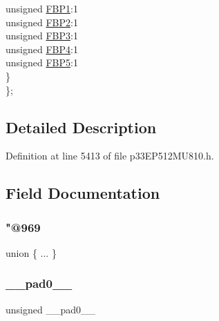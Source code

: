 \begin{DoxyCompactItemize}
\begin{tabbing}
\>\>unsigned \hyperlink{structtag_c2_f_i_f_o_b_i_t_s_afe0369a4835e96fa3b1334cd140b1d40}{FBP1}:1\\
\>\>unsigned \hyperlink{structtag_c2_f_i_f_o_b_i_t_s_a35fb89b933e40e9b8fe29b5568e9b332}{FBP2}:1\\
\>\>unsigned \hyperlink{structtag_c2_f_i_f_o_b_i_t_s_aa7a5b62ee2858665b1eb73cd44d8167a}{FBP3}:1\\
\>\>unsigned \hyperlink{structtag_c2_f_i_f_o_b_i_t_s_a2c9b756d81a91c50bd9e4a5e37d1b315}{FBP4}:1\\
\>\>unsigned \hyperlink{structtag_c2_f_i_f_o_b_i_t_s_a54c7e566a39928910ca3d2014f285fe9}{FBP5}:1\\
\>\} \\
\}; \\

\end{tabbing}\end{DoxyCompactItemize}


\subsection{Detailed Description}


Definition at line 5413 of file p33\+E\+P512\+M\+U810.\+h.



\subsection{Field Documentation}
\mbox{\label{structtag_c2_f_i_f_o_b_i_t_s_a5c68c253099898f6e51dc8c8f056cddc}} 
\subsubsection{\texorpdfstring{"@969}{@969}}
{\footnotesize\ttfamily union \{ ... \} }

\mbox{\label{structtag_c2_f_i_f_o_b_i_t_s_adf71f3d8410c1f1dbbc96680a92c49af}} 
\subsubsection{\texorpdfstring{\+\_\+\+\_\+pad0\+\_\+\+\_\+}{\_\_pad0\_\_}}
{\footnotesize\ttfamily unsigned \+\_\+\+\_\+pad0\+\_\+\+\_\+}



